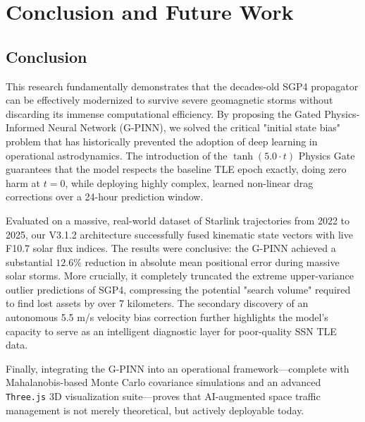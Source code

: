 \section{Conclusion and Future Work}

\subsection{Conclusion}
This research fundamentally demonstrates that the decades-old SGP4 propagator can be effectively modernized to survive severe geomagnetic storms without discarding its immense computational efficiency. By proposing the Gated Physics-Informed Neural Network (G-PINN), we solved the critical "initial state bias" problem that has historically prevented the adoption of deep learning in operational astrodynamics. The introduction of the $\tanh(5.0 \cdot t)$ Physics Gate guarantees that the model respects the baseline TLE epoch exactly, doing zero harm at $t=0$, while deploying highly complex, learned non-linear drag corrections over a 24-hour prediction window.

Evaluated on a massive, real-world dataset of Starlink trajectories from 2022 to 2025, our V3.1.2 architecture successfully fused kinematic state vectors with live F10.7 solar flux indices. The results were conclusive: the G-PINN achieved a substantial $12.6\%$ reduction in absolute mean positional error during massive solar storms. More crucially, it completely truncated the extreme upper-variance outlier predictions of SGP4, compressing the potential "search volume" required to find lost assets by over 7 kilometers. The secondary discovery of an autonomous 5.5 m/s velocity bias correction further highlights the model's capacity to serve as an intelligent diagnostic layer for poor-quality SSN TLE data.

Finally, integrating the G-PINN into an operational framework—complete with Mahalanobis-based Monte Carlo covariance simulations and an advanced \texttt{Three.js} 3D visualization suite—proves that AI-augmented space traffic management is not merely theoretical, but actively deployable today.

